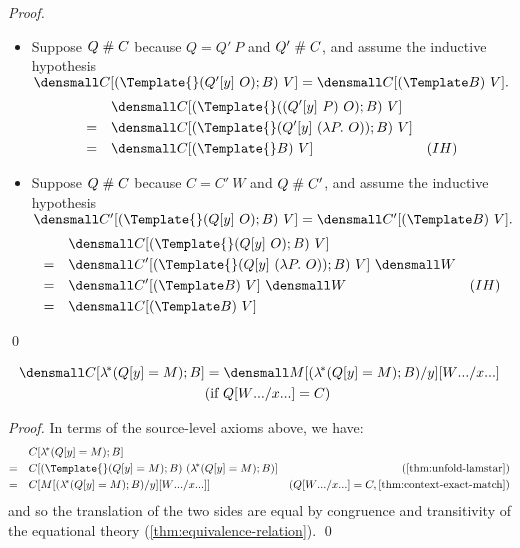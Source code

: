 \begin{proof}
\begin{itemize}
  \item Suppose $Q \mathrel{\#} C$ because $Q = Q' ~ P$ and $Q' \mathrel{\#} C$, and assume the inductive hypothesis
    \begin{math}
      \den{C[(\Template{} (Q'[y] ~ O); B) ~ V]} = \den{C[(\Template B) ~ V]}
      .
    \end{math}
    \begin{align*}
      & \quad \den{C[(\Template{} ((Q'[y] ~P) ~ O); B) ~ V]} \\
      =& \quad \den{C[(\Template{} (Q'[y] ~ (\lambda P. ~O)); B) ~ V]} \\
      =& \quad \den{C[(\Template{} B) ~ V]} & (IH)
    \end{align*}
  \item Suppose $Q \mathrel{\#} C$ because $C = C' ~ W$ and  $Q \mathrel{\#} C'$, and assume the inductive hypothesis
    \begin{math}
      \den{C'[(\Template{} (Q[y] ~ O); B) ~ V]} = \den{C'[(\Template B) ~ V]}
      .
    \end{math}
    \begin{align*}
      & \quad \den{C[(\Template{} (Q[y] ~ O); B) ~ V]} \\
      =& \quad \den{C'[(\Template{} (Q[y] ~ (\lambda P. ~O)); B) ~ V]} ~\den{W}\\
      =& \quad \den{C'[(\Template B) ~ V]} ~\den{W} & (IH)\\
      =& \quad \den{C[(\Template B) ~ V]}
    \end{align*}
  \end{itemize}
  \qed
\end{proof}

\begin{lemma}
  \label{thm:context-lamstar-match}
  \begin{align*}
    \den{C[\lamstar (Q[y] = M); B]}
    &=
    \den{M\subst{y}{(\lamstar (Q[y] = M); B)}\subst{\many{x}}{\many{W}}}
    \\
    &(\text{if } Q\subst{\many{x}}{\many{W}} = C)
  \end{align*}
\end{lemma}
\begin{proof}
  In terms of the source-level axioms above, we have:
  \begin{align*}
    &\quad
    C[\lamstar (Q[y] = M); B]
    \\
    =&\quad
    C[(\Template{} (Q[y] = M); B)~(\lamstar (Q[y]=M); B)]
    &(\cref{thm:unfold-lamstar})
    \\
    =&\quad
    C[M\subst{y}{(\lamstar (Q[y]=M); B)}\subst{\many{x}}{\many{W}}]
    &(Q\subst{\many{x}}{\many{W}} = C, \cref{thm:context-exact-match})
  \end{align*}
  and so the translation of the two sides are equal by congruence and transitivity of the equational theory (\cref{thm:equivalence-relation}).
  \qed
\end{proof}

